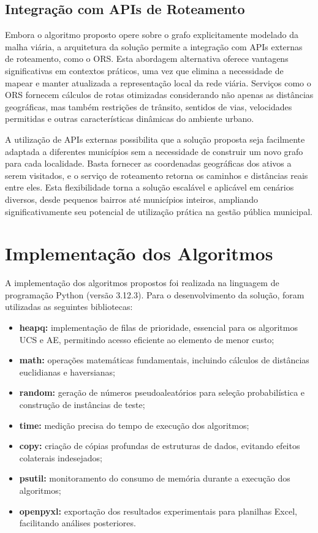 \subsection{Integração com APIs de Roteamento}

Embora o algoritmo proposto opere sobre o grafo explicitamente modelado da malha viária, a 
arquitetura da solução permite a integração com \gls{API}s externas de roteamento, como o 
\gls{ORS}. Esta abordagem alternativa 
oferece vantagens significativas em contextos práticos, uma vez que elimina a necessidade de 
mapear e manter atualizada a representação local da rede viária. Serviços como o \gls{ORS} 
fornecem cálculos de rotas otimizadas considerando não apenas as distâncias geográficas, mas 
também restrições de trânsito, sentidos de vias, velocidades permitidas e outras características 
dinâmicas do ambiente urbano.

A utilização de \gls{API}s externas possibilita que a solução proposta seja facilmente adaptada 
a diferentes municípios sem a necessidade de construir um novo grafo para cada localidade. Basta 
fornecer as coordenadas geográficas dos ativos a serem visitados, e o serviço de roteamento retorna 
os caminhos e distâncias reais entre eles. Esta flexibilidade torna a solução escalável e aplicável 
em cenários diversos, desde pequenos bairros até municípios inteiros, ampliando significativamente 
seu potencial de utilização prática na gestão pública municipal.





\section{Implementação dos Algoritmos}

A implementação dos algoritmos propostos foi realizada na linguagem de programação Python 
(versão 3.12.3). Para o desenvolvimento da solução, foram utilizadas as seguintes bibliotecas:

\begin{itemize}
    \item \textbf{heapq:} implementação de filas de prioridade, essencial para os algoritmos 
    \gls{UCS} e \gls{AE}, permitindo acesso eficiente ao elemento de menor custo;
    \item \textbf{math:} operações matemáticas fundamentais, incluindo cálculos de distâncias 
    euclidianas e haversianas;
    \item \textbf{random:} geração de números pseudoaleatórios para seleção probabilística e 
    construção de instâncias de teste;
    \item \textbf{time:} medição precisa do tempo de execução dos algoritmos;
    \item \textbf{copy:} criação de cópias profundas de estruturas de dados, evitando efeitos 
    colaterais indesejados;
    \item \textbf{psutil:} monitoramento do consumo de memória durante a execução dos algoritmos;
    \item \textbf{openpyxl:} exportação dos resultados experimentais para planilhas Excel, 
    facilitando análises posteriores.
\end{itemize}

